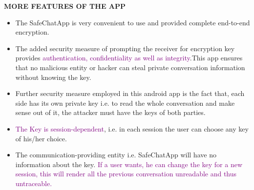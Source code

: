 \documentclass{beamer}
\begin{document}
\begin{frame}
\begin{tcolorbox}
\begin{center}
\textsc{\textbf{\textcolor{byzantium}{MORE FEATURES OF THE APP}}}
\end{center} 
\end{tcolorbox}
\begin{flushleft}
\begin{itemize}
\item The SafeChatApp is very convenient to use and provided complete end-to-end encryption.  
\item The added security measure of prompting the receiver for encryption key provides \textcolor{purple} { authentication, confidentiality as well as integrity}.This app ensures that no malicious entity or hacker can steal private conversation information without knowing the key.
\item Further security measure employed in this android app is the fact that, each side has its own private key i.e. to read the whole conversation and make sense out of it, the attacker must have the keys of both parties.
\item \textcolor{purple} {The Key is session-dependent}, i.e. in each session the user can choose any key of his/her choice. 
\item The communication-providing entity i.e. SafeChatApp will have no information about the key. \textcolor{purple} {If a user wants, he can change the key for a new session, this will render all the previous conversation unreadable and thus untraceable.}
\end{itemize}
\end{flushleft}
\end{frame}
\end{document}
